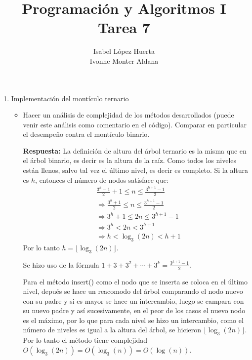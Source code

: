 \documentclass[11pt]{article}
\title{Programación y Algoritmos I \\Tarea 7}
\author{Isabel López Huerta\\Ivonne Monter Aldana}
\begin{document}
\maketitle
\begin{enumerate}
\item Implementación del montículo ternario
\begin{itemize}
 \item Hacer un análisis de complejidad de los métodos desarrollados (puede venir este análisis como comentario en el código). Comparar en particular el desempeño contra el montículo binario.
 
 \textbf{Respuesta:}
La definición de altura del árbol ternario es la misma que en el árbol binario, es decir es la altura de la raíz. 
Como todos los niveles están llenos, salvo tal vez el último nivel, es decir es completo. Si la altura es $h$, entonces el número de nodos satisface que:
\begin{align*}
&\frac{3^{h}-1}{2}+1\leq n \leq \frac{3^{h+1}-1}{2}\\
&\Rightarrow\frac{3^{h}+1}{2}\leq n \leq \frac{3^{h+1}-1}{2}\\
&\Rightarrow 3^{h}+1\leq 2n \leq 3^{h+1}-1\\
&\Rightarrow 3^{h}< 2n < 3^{h+1}\\
&\Rightarrow h< \log_3(2n) < h+1
\end{align*} 
Por lo tanto $h= \lfloor\log_3(2n)\rfloor$.

Se hizo uso de la fórmula  $1+3+3^2+\cdots +3^k=\frac{3^{k+1}-1}{2}$.

Para el método insert() como el nodo que se inserta se coloca en el último nivel, depués se hace un reacomodo del árbol comparando el nodo nuevo con su padre y si es mayor se hace un intercambio, luego se campara con su nuevo padre y así sucesivamente, en el peor de los casos el nuevo nodo es el máximo, por lo que para cada nivel se hizo un intercambio, como el número de niveles es igual a la altura del árbol, se hicieron $\lfloor\log_3(2n)\rfloor$. Por lo tanto el método tiene complejidad $O(\log_3(2n))=O(\log_3(n))=O(\log(n))$.


\end{itemize}
\end{enumerate}
\end{document}

